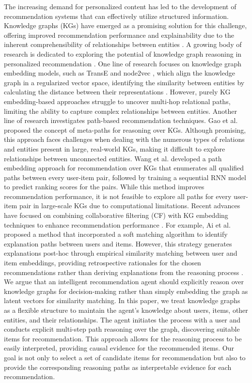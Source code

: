 \documentclass[11pt]{article}
\begin{document}
The increasing demand for personalized content has led to the development of recommendation systems that can effectively utilize structured information. Knowledge graphs (KGs) have emerged as a promising solution for this challenge, offering improved recommendation performance and explainability due to the inherent comprehensibility of relationships between entities \cite{nickel2011three}. A growing body of research is dedicated to exploring the potential of knowledge graph reasoning in personalized recommendation \cite{a11090137, bordes2013translating, grover2016node2vec, wang2016structural}.
One line of research focuses on knowledge graph embedding models, such as TransE \cite{bordes2013translating} and node2vec \cite{grover2016node2vec}, which align the knowledge graph in a regularized vector space, identifying the similarity between entities by calculating the distance between their representations \cite{zhang2016collaborative}. However, purely KG embedding-based approaches struggle to uncover multi-hop relational paths, limiting the ability to capture complex relationships between entities.
Another line of research investigates path-based recommendation techniques. Gao et al. \cite{gao2018recommendation} proposed the concept of meta-paths for reasoning over KGs. Although promising, this approach faces challenges when dealing with the numerous types of relations and entities present in large, real-world KGs, making it difficult to explore relationships between unconnected entities. Wang et al. \cite{wang2019explainable} developed a path embedding approach for recommendation over KGs that enumerates all qualified paths between every user-item pair, followed by training a sequential RNN model to predict ranking scores for the pairs. While this method improves recommendation performance, it is not feasible to explore all paths for every user-item pair in large-scale KGs due to computational limitations.
Recent advances have focused on combining collaborative filtering (CF) with KG embedding techniques to enhance recommendation performance \cite{zhang2016collaborative, a11090137}. For example, Ai et al. \cite{ a11090137} proposed a method that incorporated a soft matching algorithm to identify explanation paths between users and items. However, this strategy generates explanations post-hoc through empirical similarity matching between user and item embeddings, providing retrospective rationales for the chosen recommendations rather than deriving explanations from the reasoning process \cite{10.1145/3331184.3331203}.
We argue that an intelligent recommendation agent should explicitly reason over knowledge graphs for decision-making rather than simply embedding the graph as latent vectors for similarity matching. In this paper, we treat knowledge graphs as a flexible structure to maintain the agent's knowledge about users, items, other entities, and their relationships. The agent initiates the process with a user and conducts explicit multi-step path reasoning over the graph, discovering suitable items for recommendation. This approach allows for the reasoning process to be easily interpreted, providing causal evidence for the recommended items. Our goal is not only to select a set of candidate items for recommendation but also to provide the corresponding reasoning paths as interpretable evidence for each recommendation.
\end{document}
